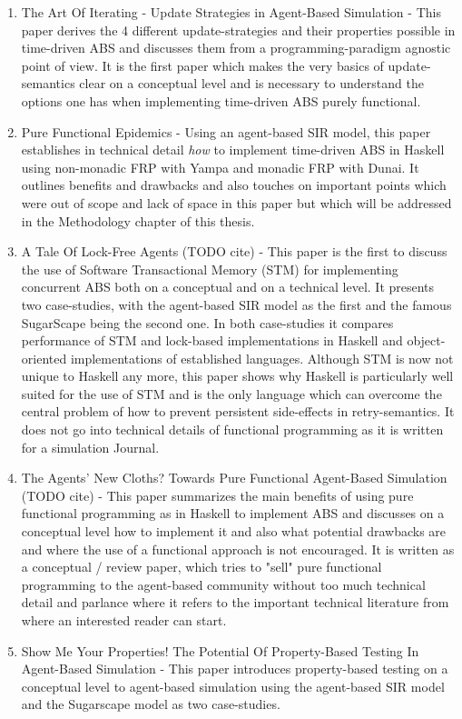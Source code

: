 \begin{enumerate}
	\item The Art Of Iterating - Update Strategies in Agent-Based Simulation \cite{thaler_art_2017} - This paper derives the 4 different update-strategies and their properties possible in time-driven ABS and discusses them from a programming-paradigm agnostic point of view. It is the first paper which makes the very basics of update-semantics clear on a conceptual level and is necessary to understand the options one has when implementing time-driven ABS purely functional.
	
	\item Pure Functional Epidemics \cite{thaler_pure_2019} - Using an agent-based SIR model, this paper establishes in technical detail \textit{how} to implement time-driven ABS in Haskell using non-monadic FRP with Yampa and monadic FRP with Dunai. It outlines benefits and drawbacks and also touches on important points which were out of scope and lack of space in this paper but which will be addressed in the Methodology chapter of this thesis.
	
	\item A Tale Of Lock-Free Agents (TODO cite) - This paper is the first to discuss the use of Software Transactional Memory (STM) for implementing concurrent ABS both on a conceptual and on a technical level. It presents two case-studies, with the agent-based SIR model as the first and the famous SugarScape being the second one. In both case-studies it compares performance of STM and lock-based implementations in Haskell and object-oriented implementations of established languages. Although STM is now not unique to Haskell any more, this paper shows why Haskell is particularly well suited for the use of STM and is the only language which can overcome the central problem of how to prevent persistent side-effects in retry-semantics. It does not go into technical details of functional programming as it is written for a simulation Journal.

	\item The Agents' New Cloths? Towards Pure Functional Agent-Based Simulation (TODO cite) - This paper summarizes the main benefits of using pure functional programming as in Haskell to implement ABS and discusses on a conceptual level how to implement it and also what potential drawbacks are and where the use of a functional approach is not encouraged. It is written as a conceptual / review paper, which tries to "sell" pure functional programming to the agent-based community without too much technical detail and parlance where it refers to the important technical literature from where an interested reader can start.
	
	\item Show Me Your Properties! The Potential Of Property-Based Testing In Agent-Based Simulation - This paper introduces property-based testing on a conceptual level to agent-based simulation using the agent-based SIR model and the Sugarscape model as two case-studies. 
\end{enumerate}

